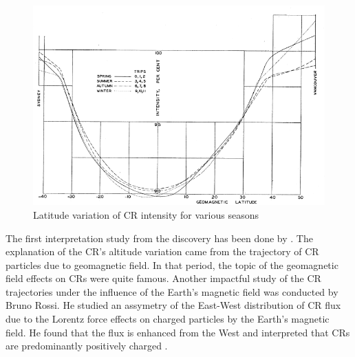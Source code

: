 \begin{figure}[h!]
    \centering
    \includegraphics[width=\textwidth]{content/background/figures/compton_sail_1937.png}
    \caption{
        Latitude variation of CR intensity for various seasons 
        \citep{compton1937cosmic}
    }
    \label{fig:comptonship}
\end{figure}
	
The first interpretation study from the discovery has been
done by \cite{stormer1934critical}. The explanation of the CR's altitude variation
came from the trajectory of CR particles due to geomagnetic field.
In that period, the topic of the geomagnetic field
effects on CRs were quite famous.
Another impactful study of the
CR trajectories under the influence of the
Earth's magnetic field was conducted by
Bruno Rossi. He studied an assymetry of the East-West distribution
of CR flux due to the Lorentz force effects on charged particles
by the Earth's magnetic field. He found that the flux is enhanced
from the West and interpreted that CRs are predominantly
positively charged \citep{rossi1941cosmic}.




